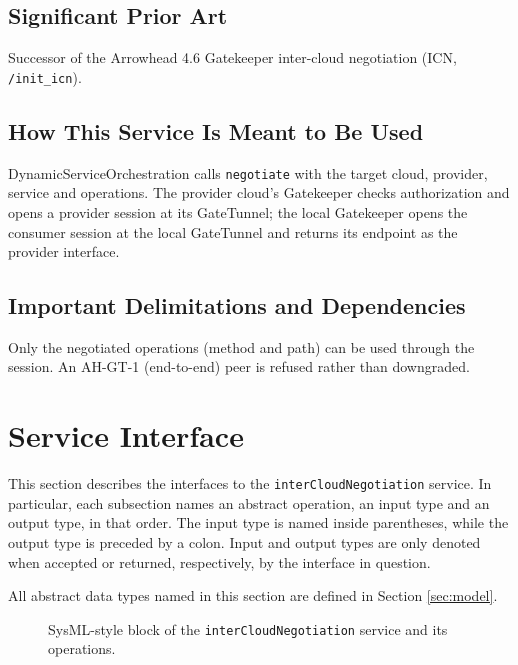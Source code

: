 \documentclass[a4paper]{arrowhead}
\begin{document}
\subsection{Significant Prior Art}

Successor of the Arrowhead 4.6 Gatekeeper inter-cloud negotiation (ICN, \texttt{/\allowbreak{}init\_\allowbreak{}icn}).

\subsection{How This Service Is Meant to Be Used}

Dynamic\allowbreak{}Service\allowbreak{}Orchestration calls \texttt{negotiate} with the target cloud, provider, service and operations. The provider cloud's Gatekeeper checks authorization and opens a provider session at its GateTunnel; the local Gatekeeper opens the consumer session at the local GateTunnel and returns its endpoint as the provider interface.

\subsection{Important Delimitations and Dependencies}
\label{sec:delimitations}

Only the negotiated operations (method and path) can be used through the session. An AH-GT-1 (end-to-end) peer is refused rather than downgraded.

\newpage

\section{Service Interface}
\label{sec:operations}

This section describes the interfaces to the \texttt{inter\allowbreak{}Cloud\allowbreak{}Negotiation} service.
In particular, each subsection names an abstract operation, an input type and an output type, in that order.
The input type is named inside parentheses, while the output type is preceded by a colon.
Input and output types are only denoted when accepted or returned, respectively, by the interface in question.

All abstract data types named in this section are defined in Section \ref{sec:model}.

\begin{figure}[ht!]
  \centering
  \caption{SysML-style block of the \texttt{inter\allowbreak{}Cloud\allowbreak{}Negotiation} service and its operations.}
  \label{fig:SD}
\end{figure}
\end{document}
